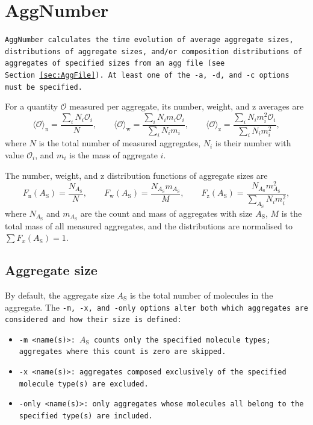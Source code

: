 \section{AggNumber} \label{sec:AggNumber}

\tt{AggNumber} calculates the time evolution of average aggregate sizes,
distributions of aggregate sizes, and/or composition distributions of aggregates
of specified sizes from an \tt{agg} file (see Section~\ref{sec:AggFile}). At
least one of the \tt{-a}, \tt{-d}, and \tt{-c} options must be specified.

For a quantity $\mathcal{O}$ measured per aggregate, its number, weight, and z
averages are
\begin{equation}\label{eq:Avg}
  \langle\mathcal{O}\rangle_{\text{n}} = \frac{\sum_i N_i\mathcal{O}_i}{N},
  \qquad
  \langle\mathcal{O}\rangle_{\text{w}} =
    \frac{\sum_i N_i m_i\mathcal{O}_i}{\sum_i N_i m_i},
  \qquad
  \langle\mathcal{O}\rangle_{\text{z}} =
    \frac{\sum_i N_i m_i^2\mathcal{O}_i}{\sum_i N_i m_i^2},
\end{equation}
where $N$ is the total number of measured aggregates, $N_i$ is their number with
value $\mathcal{O}_i$, and $m_i$ is the mass of aggregate $i$.

The number, weight, and z distribution functions of aggregate sizes are
\begin{equation} \label{eq:Fnwz}
  F_{\text{n}}(A_\text{S}) = \frac{N_{A_{\text{S}}}}{N},
  \qquad
  F_{\text{w}}(A_\text{S}) = \frac{N_{A_{\text{S}}} m_{A_{\text{S}}}}{M},
  \qquad
  F_{\text{z}}(A_\text{S}) =
    \frac{N_{A_{\text{S}}} m^2_{A_{\text{S}}}}{\sum_{A_{\text{S}}} N_i m_i^2},
\end{equation}
where $N_{A_\text{S}}$ and $m_{A_\text{S}}$ are the count and mass of aggregates
with size $A_\text{S}$, $M$ is the total mass of all measured aggregates, and
the distributions are normalised to $\sum F_x(A_\text{S}) = 1$.

\subsection{Aggregate size} \label{subsec:AggNumber-size}

By default, the aggregate size $A_\text{S}$ is the total number of molecules in
the aggregate. The \tt{-m}, \tt{-x}, and \tt{-only} options alter both which
aggregates are considered and how their size is defined:

\begin{itemize}
  \item \tt{-m <name(s)>}: $A_\text{S}$ counts only the specified molecule
    types; aggregates where this count is zero are skipped.
  \item \tt{-x <name(s)>}: aggregates composed exclusively of the specified
    molecule type(s) are excluded.
  \item \tt{-only <name(s)>}: only aggregates whose molecules all belong to the
    specified type(s) are included.
\end{itemize}

